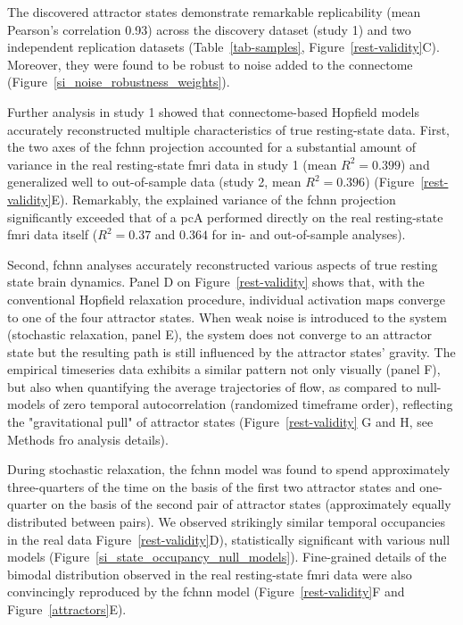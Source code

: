 \documentclass{article}
\begin{document}
The discovered attractor states demonstrate remarkable replicability (mean Pearson's
correlation 0.93) across the discovery dataset (study 1) and two independent replication datasets
(Table~\ref{tab-samples}, Figure~\ref{rest-validity}C). Moreover, they were found to be robust to noise added to the connectome (Figure~\ref{si_noise_robustness_weights}).

Further analysis in study 1 showed that connectome-based Hopfield models accurately reconstructed multiple
characteristics of true resting-state data.
First, the two axes of the \acrshort{fchnn} projection accounted for a substantial amount of variance in the real resting-state \acrshort{fmri} data in study 1 (mean $R^2=0.399$) and generalized well to out-of-sample data (study 2, mean $R^2=0.396$)  (Figure~\ref{rest-validity}E). Remarkably, the explained variance of the \acrshort{fchnn} projection significantly exceeded that of a \acrshort{pc}A performed directly on the real resting-state \acrshort{fmri} data itself ($R^2=0.37$ and $0.364$ for in- and out-of-sample analyses).

Second, \acrshort{fchnn} analyses accurately reconstructed various aspects of true resting state brain dynamics.
Panel D on Figure~\ref{rest-validity} shows that, with the conventional Hopfield relaxation procedure, individual activation maps converge to one of the four attractor states. When weak noise is introduced to the system (stochastic relaxation, panel E), the system does not converge to an attractor state but the resulting path is still influenced by the attractor states' gravity. The empirical timeseries data exhibits a similar pattern not only visually (panel F), but also when quantifying the average trajectories of flow, as compared to null-models of zero temporal autocorrelation (randomized timeframe order), reflecting the "gravitational pull" of attractor states (Figure~\ref{rest-validity} G and H, see Methods fro analysis details).

During stochastic relaxation, the \acrshort{fchnn} model was found to spend approximately three-quarters of the time on the basis of the first two attractor states and one-quarter on the basis of the second pair of attractor states (approximately equally distributed between pairs). We observed strikingly similar temporal occupancies in the real data Figure~\ref{rest-validity}D), statistically significant with various null models (Figure~\ref{si_state_occupancy_null_models}). Fine-grained details of the bimodal distribution observed in the real resting-state \acrshort{fmri} data were also convincingly reproduced by the \acrshort{fchnn} model (Figure~\ref{rest-validity}F and Figure~\ref{attractors}E).
\end{document}
